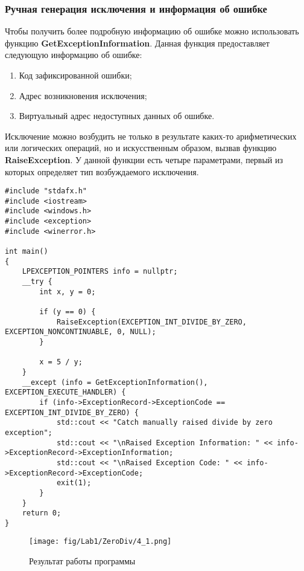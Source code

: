\subsubsection{Ручная генерация исключения и информация об ошибке}
Чтобы получить более подробную информацию об ошибке можно использовать функцию \textbf{GetExceptionInformation}. Данная функция предоставляет следующую информацию об ошибке:
\begin{enumerate}
    \item Код зафиксированной ошибки;
    \item Адрес возникновения исключения;
    \item Виртуальный адрес недоступных данных об ошибке.
\end{enumerate}
Исключение можно возбудить не только в результате каких-то арифметических или логических операций, но и искусственным образом, вызвав функцию \textbf{RaiseException}.
У данной функции есть четыре параметрами, первый из которых определяет тип возбуждаемого исключения.

\begin{lstlisting}[caption=Ручная генерация исключения и информация об ошибке]
#include "stdafx.h"
#include <iostream>
#include <windows.h>
#include <exception>
#include <winerror.h>

int main()
{
    LPEXCEPTION_POINTERS info = nullptr;
    __try {
        int x, y = 0;

        if (y == 0) {
            RaiseException(EXCEPTION_INT_DIVIDE_BY_ZERO, EXCEPTION_NONCONTINUABLE, 0, NULL);
        }

        x = 5 / y;
    }
    __except (info = GetExceptionInformation(), EXCEPTION_EXECUTE_HANDLER) {
        if (info->ExceptionRecord->ExceptionCode == EXCEPTION_INT_DIVIDE_BY_ZERO) {
            std::cout << "Catch manually raised divide by zero exception";
            std::cout << "\nRaised Exception Information: " << info->ExceptionRecord->ExceptionInformation;
            std::cout << "\nRaised Exception Code: " << info->ExceptionRecord->ExceptionCode;
            exit(1);
        }
    }
    return 0;
}
\end{lstlisting}

\begin{figure}[H]
    \begin{center}
        \texttt{[image: fig/Lab1/ZeroDiv/4\_1.png]}
        \caption{Результат работы программы}
        \label{pic:4_1}
    \end{center}
\end{figure}

